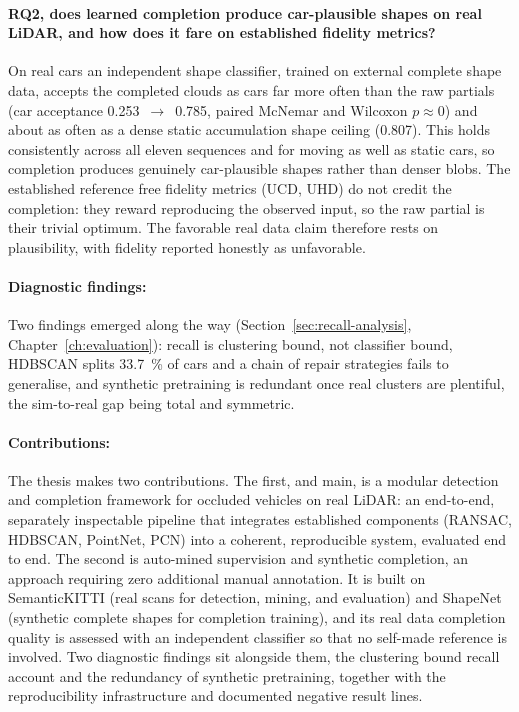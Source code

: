 \documentclass[a4paper,12pt]{report}
\begin{document}
\paragraph{RQ2, does learned completion produce car-plausible shapes on real LiDAR, and
how does it fare on established fidelity metrics?} On real cars an independent shape
classifier, trained on external complete shape data, accepts the completed clouds as cars far
more often than the raw partials (car acceptance
\num{0.253}~$\rightarrow$~\num{0.785}, paired McNemar and Wilcoxon $p\approx0$) and about as
often as a dense static accumulation shape ceiling (\num{0.807}). This holds consistently across all
eleven sequences and for moving as well as static cars, so completion produces genuinely
car-plausible shapes rather than denser blobs. The established reference free fidelity metrics
(UCD, UHD) do not credit the completion: they reward reproducing the observed input, so the
raw partial is their trivial optimum. The favorable real data claim therefore rests on
plausibility, with fidelity reported honestly as unfavorable.

\paragraph{Diagnostic findings:}
Two findings emerged along the way (Section~\ref{sec:recall-analysis},
Chapter~\ref{ch:evaluation}): recall is clustering bound, not classifier bound, HDBSCAN
splits \SI{33.7}{\percent} of cars and a chain of repair strategies fails to
generalise, and synthetic pretraining is redundant once real clusters are plentiful, the
sim-to-real gap being total and symmetric.

\paragraph{Contributions:}
The thesis makes two contributions. The first, and main, is a modular
detection and completion framework for occluded vehicles on real LiDAR: an end-to-end,
separately inspectable pipeline that integrates established components (RANSAC, HDBSCAN,
PointNet, PCN) into a coherent, reproducible system, evaluated end to end. The second is
auto-mined supervision and synthetic completion, an approach requiring zero additional
manual annotation. It is built on SemanticKITTI (real scans for detection, mining, and
evaluation) and ShapeNet (synthetic complete shapes for completion training), and its
real data completion quality is assessed with an independent classifier so that no
self-made reference is involved. Two diagnostic findings sit alongside
them, the clustering bound recall account and the redundancy of synthetic pretraining,
together with the reproducibility infrastructure and documented negative result lines.
\end{document}
